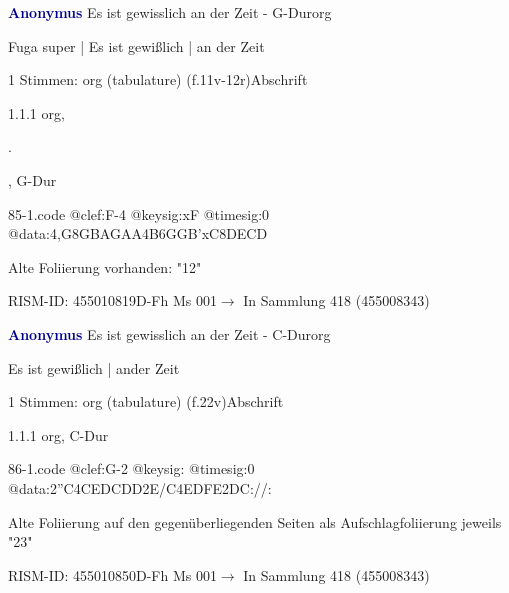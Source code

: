 \documentclass[twocolumn, 12pt]{book}
\begin{document}
\par \vspace{16pt} \textcolor{darkblue}{\textbf{Anonymus  }}\hfillplus{\textbf{[85]}}\newline Es ist gewisslich an der Zeit - G-Dur\newline org
\par \begin{itshape}[f.11v, at left:] Fuga super | Es ist gewißlich | an der Zeit\end{itshape} 
\par \textcolor{darkblue}{}  1 Stimmen: org (tabulature)  (f.11v-12r)\newline Abschrift
\par 1.1.1  org, \begin{itshape}.\end{itshape}, G-Dur  
\begin{filecontents*}{85-1.code}
@clef:F-4
@keysig:xF
@timesig:0
@data:4,G{8GB}{AGAA}4B{6GGB'xC}{8DECD}
\end{filecontents*}
\newline %
\par Alte Foliierung vorhanden: "12"
\par RISM-ID: 455010819\newline D-Fh  Ms 001\newline $\rightarrow$ In Sammlung 418 (455008343)
      
\par \vspace{16pt} \textcolor{darkblue}{\textbf{Anonymus  }}\hfillplus{\textbf{[86]}}\newline Es ist gewisslich an der Zeit - C-Dur\newline org
\par \begin{itshape}[f.22v, at left:] Es ist gewißlich | ander Zeit\end{itshape} 
\par \textcolor{darkblue}{}  1 Stimmen: org (tabulature)  (f.22v)\newline Abschrift
\par 1.1.1  org, C-Dur  
\begin{filecontents*}{86-1.code}
@clef:G-2
@keysig:
@timesig:0
@data:2''C4CEDCDD2E/C4EDFE2DC://:
\end{filecontents*}
\newline %
\par Alte Foliierung auf den gegenüberliegenden Seiten als Aufschlagfoliierung jeweils "23"
\par RISM-ID: 455010850\newline D-Fh  Ms 001\newline $\rightarrow$ In Sammlung 418 (455008343)
      
\end{document}
